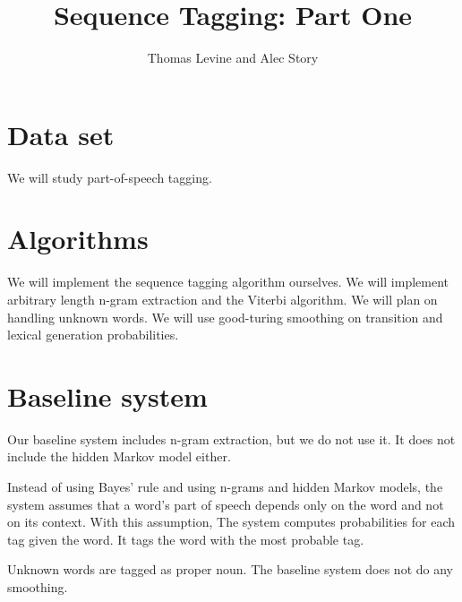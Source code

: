 \documentclass{article}
\title{Sequence Tagging: Part One}
\author{Thomas Levine and Alec Story}
\begin{document}
\section{Data set}
We will study part-of-speech tagging.
\section{Algorithms}
We will implement the sequence tagging algorithm ourselves.
We will implement arbitrary length n-gram extraction and the Viterbi algorithm.
We will plan on handling unknown words. %
We will use good-turing smoothing on transition and lexical generation probabilities. %


\section{Baseline system}
Our baseline system includes n-gram extraction,
but we do not use it.
It does not include the hidden Markov model either.

Instead of using Bayes' rule and using n-grams and hidden Markov models,
the system assumes that a word's part of speech depends only
on the word and not on its context. With this assumption,
The system computes probabilities for each tag given the word.
It tags the word with the most probable tag.

Unknown words are tagged as proper noun.
The baseline system does not do any smoothing.

\end{document}
